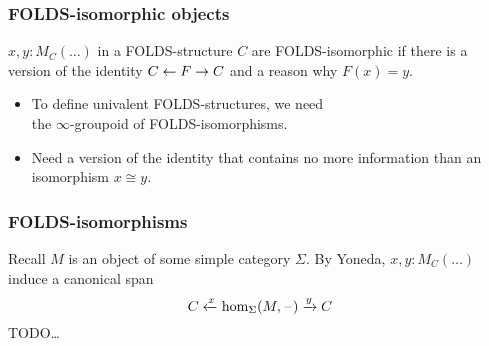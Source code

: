\documentclass{beamer}
\newcommand{\blank}{\mathord{\hspace{1pt}\text{--}\hspace{1pt}}}
\begin{document}
\begin{frame}
  \frametitle{FOLDS-isomorphic objects}
  \begin{definition}
    $x,y:M_C(\dots)$ in a FOLDS-structure $C$ are \alert<1>{FOLDS-isomorphic} if there is a version of the identity $C\leftarrow F \to C$ and a reason why $F(x)=y$.
  \end{definition}
  \pause
  \begin{itemize}
  \item To define univalent FOLDS-structures, we need\\ \alert<2>{the $\infty$-groupoid of} FOLDS-isomorphisms.
    \pause
  \item Need a version of the identity that contains \alert<3>{no more information} than an isomorphism $x\cong y$.
  \end{itemize}
\end{frame}

\begin{frame}
  \frametitle{FOLDS-isomorphisms}
  Recall $M$ is an object of some simple category $\Sigma$.
  By Yoneda, $x,y:M_C(\dots)$ induce a canonical span
  \[ C \xot{x} \hom_\Sigma(M,\blank) \xto{y} C \]
  TODO\dots
\end{frame}
\end{document}
